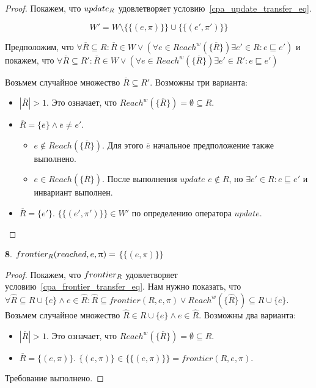 \begin{proof}
Покажем, что $update_R$ удовлетворяет условию~\ref{cpa_update_transfer_eq}.

$$ W' = W \setminus \{\{(e, \pi)\}\} \cup \{\{(e', \pi')\}\}$$

Предположим, что 
$\forall \overline{R} \subseteq R: \overline{R} \in W \lor (\forall e \in Reach^w(\{\overline{R}\}) \exists e' \in R: e \sqsubseteq e')$ 
и покажем, что
$\forall \overline{R} \subseteq R': \overline{R} \in W \lor (\forall e \in Reach^w(\{\overline{R}\}) \exists e' \in R': e \sqsubseteq e')$

Возьмем случайное множество $\overline{R} \subseteq R'$. Возможны три варианта:

\begin{itemize}
\item $|\overline{R}| > 1$. Это означает, что $Reach^w(\{\overline{R}\}) = \emptyset \subseteq R$.
\item $\overline{R} = \{\overline{e}\} \land \overline{e} \neq e'$.
\begin{itemize}
\item $e \notin Reach(\{\overline{R}\})$. Для этого $\overline{e}$ начальное предположение также выполнено.
\item $e \in Reach(\{\overline{R}\})$. После выполнения $update$ $e \notin R$, но $\exists e' \in R: e \sqsubseteq e'$ и инвариант выполнен.
\end{itemize}
\item $\overline{R} = \{e'\}$. $\{\{(e', \pi')\}\} \in W'$ по определению оператора $update$.
\end{itemize}

\end{proof}


{\textbf 8.} 
$frontier_R(reached, e, \uppi)=$
$\{\{(e, \pi)\}\}$

\begin{proof}
Покажем, что $frontier_R$ удовлетворяет условию~\ref{cpa_frontier_transfer_eq}.
Нам нужно показать, что
$\forall \widehat{R} \subseteq R \cup \{e\} \land e \in \widehat{R}: \widehat{R} \subseteq frontier(R, e, \pi) \lor Reach^w(\{\widehat{R}\}) \subseteq R \cup \{e\}$. 
Возьмем случайное множество $\widehat{R} \in R \cup \{e\} \land e \in \widehat{R}$. Возможны два варианта:

\begin{itemize}
\item $|\overline{R}| > 1$. Это означает, что $Reach^w(\{\overline{R}\}) = \emptyset \subseteq R$.
\item $\overline{R} = \{(e, \pi)\}$. $\{(e, \pi)\} \in \{\{(e, \pi)\}\} = frontier(R, e, \pi)$.
\end{itemize}

Требование выполнено.

\end{proof}

